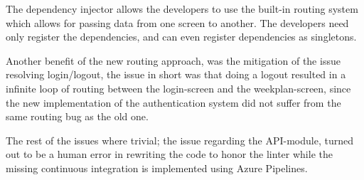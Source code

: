 The dependency injector allows the developers to use the built-in routing system which allows for passing data from one screen to another. The developers need only register the dependencies, and can even register dependencies as singletons.

Another benefit of the new routing approach, was the mitigation of the issue resolving login/logout, the issue in short was that doing a logout resulted in a infinite loop of routing between the login-screen and the weekplan-screen, since the new implementation of the authentication system did not suffer from the same routing bug as the old one.

The rest of the issues where trivial; the issue regarding the API-module, turned out to be a human error in rewriting the code to honor the linter while the missing continuous integration is implemented using Azure Pipelines.